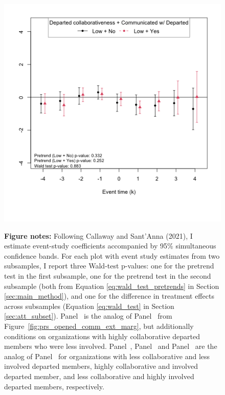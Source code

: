 \begin{figure}
\begin{minipage}[b]{0.48\textwidth}
    \end{minipage}
    \hfill
    \begin{minipage}[b]{0.48\textwidth}
        \centering
         \label{fig:predep_prs_opened_low_collab_comm_ext_marg_inv1}
        \includegraphics[width=\textwidth]{temp/output/collab_imp/inv1_cs_norm_prs_opened_dept_never_comm_predep_Low.png}
    \end{minipage}

  \begin{minipage}{1\textwidth}
    \textbf{Figure notes:} 
    Following Callaway and Sant’Anna (2021), I estimate event-study coefficients accompanied by 95\% simultaneous confidence bands. For each plot with event study estimates from two subsamples, I report three Wald-test p-values: one for the pretrend test in the first subsample, one for the pretrend test in the second subsample (both from Equation \ref{eq:wald_test_pretrends} in Section \ref{sec:main_method}), and one for the difference in treatment effects across subsamples (Equation \ref{eq:wald_test} in Section \ref{sec:att_subset}). Panel~ is the analog of Panel~ from Figure~\ref{fig:prs_opened_comm_ext_marg}, but additionally conditions on organizations with highly collaborative departed members who were less involved. Panel~, Panel~ and Panel~ are the analog of Panel~ for organizations with less collaborative and less involved departed members, highly collaborative and involved departed member, and less collaborative and highly involved departed members, respectively. 
\end{minipage}
  

\end{figure}
